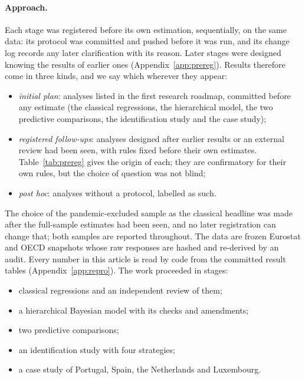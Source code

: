 \paragraph{Approach.} Each stage was registered before its own estimation, sequentially,
on the same data: its protocol was committed and pushed before it was run, and its change
log records any later clarification with its reason. Later stages were designed knowing
the results of earlier ones (Appendix~\ref{app:prereg}). Results therefore come in three
kinds, and we say which wherever they appear:
\begin{itemize}
  \item \emph{initial plan}: analyses listed in the first research roadmap, committed
    before any estimate (the classical regressions, the hierarchical model, the two
    predictive comparisons, the identification study and the case study);
  \item \emph{registered follow-ups}: analyses designed after earlier results or an
    external review had been seen, with rules fixed before their own estimates. Table~\ref{tab:prereg}
    gives the origin of each; they are confirmatory for their own rules, but the choice of
    question was not blind;
  \item \emph{post hoc}: analyses without a protocol, labelled as such.
\end{itemize}
The choice of the pandemic-excluded sample as the classical headline was made after the
full-sample estimates had been seen, and no later registration can change that; both
samples are reported throughout. The data are frozen Eurostat and OECD snapshots
whose raw responses are hashed and re-derived by an audit. Every number in this article is
read by code from the committed result tables (Appendix~\ref{app:repro}). The work
proceeded in stages:
\begin{itemize}
  \item classical regressions and an independent review of them;
  \item a hierarchical Bayesian model with its checks and amendments;
  \item two predictive comparisons;
  \item an identification study with four strategies;
  \item a case study of Portugal, Spain, the Netherlands and Luxembourg.
\end{itemize}

